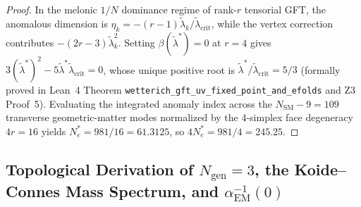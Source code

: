 \documentclass[11pt,a4paper]{article}
\theoremstyle{plain}
\theoremstyle{definition}
\theoremstyle{remark}
\begin{document}
\begin{proof}
In the melonic $1/N$ dominance regime of rank-$r$ tensorial GFT, the anomalous dimension is $\eta_k = -(r-1)\tilde{\lambda}_k/\tilde{\lambda}_{\mathrm{crit}}$, while the vertex correction contributes $-(2r-3)\tilde{\lambda}_k^2$. Setting $\beta(\tilde{\lambda}^*) = 0$ at $r = 4$ gives $3(\tilde{\lambda}^*)^2 - 5\tilde{\lambda}^*\tilde{\lambda}_{\mathrm{crit}} = 0$, whose unique positive root is $\tilde{\lambda}^*/\tilde{\lambda}_{\mathrm{crit}} = 5/3$ (formally proved in Lean~4 Theorem \texttt{wetterich\_gft\_uv\_fixed\_point\_and\_efolds} and Z3 Proof~5). Evaluating the integrated anomaly index across the $N_{\mathrm{SM}} - 9 = 109$ transverse geometric-matter modes normalized by the 4-simplex face degeneracy $4r = 16$ yields $N_e^* = 981/16 = 61.3125$, so $4 N_e^* = 981/4 = 245.25$.
\end{proof}

\subsection[Derivation of $N_{\mathrm{gen}} = 3$, the Koide--Connes Mass Spectrum, and $\alpha_{\mathrm{EM}}^{-1}(0)$]{Topological Derivation of $N_{\mathrm{gen}} = 3$, the Koide--Connes Mass Spectrum, and $\alpha_{\mathrm{EM}}^{-1}(0)$}
\end{document}
